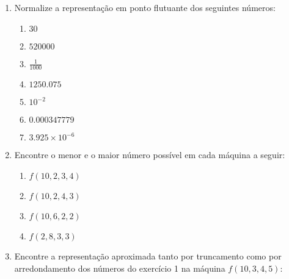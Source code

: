 \documentclass[a4paper]{article}
\begin{document}
\begin{enumerate}
\item Normalize a representação em ponto flutuante dos seguintes
  números:
  \begin{enumerate}
  \item $30$ %
  \item $520000$ %
  \item $\frac{1}{1000}$ %
  \item $1250.075$ %
  \item $10^{-2}$ %
  \item $0.000347779$ %
  \item $3.925 \times 10^{-6}$ %
  \end{enumerate}

\item Encontre o menor e o maior número possível em cada máquina a
  seguir:
  \begin{enumerate}
  \item $f(10,2,3,4)$ %
  \item $f(10,2,4,3)$ %
  \item $f(10,6,2,2)$ %
  \item $f(2,8,3,3)$ %
  \end{enumerate}


\item Encontre a representação aproximada tanto por truncamento como
  por arredondamento dos números do exercício 1 na máquina
  $f(10,3,4,5)$:


\end{enumerate}
\end{document}

